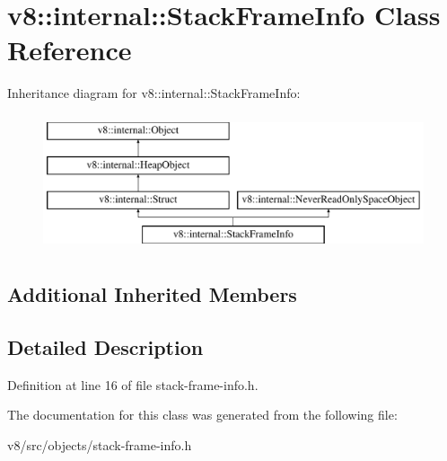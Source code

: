 \hypertarget{classv8_1_1internal_1_1StackFrameInfo}{}\section{v8\+:\+:internal\+:\+:Stack\+Frame\+Info Class Reference}
\label{classv8_1_1internal_1_1StackFrameInfo}
Inheritance diagram for v8\+:\+:internal\+:\+:Stack\+Frame\+Info\+:\begin{figure}[H]
\begin{center}
\leavevmode
\includegraphics[height=4.000000cm]{classv8_1_1internal_1_1StackFrameInfo}
\end{center}
\end{figure}
\subsection*{Additional Inherited Members}


\subsection{Detailed Description}


Definition at line 16 of file stack-\/frame-\/info.\+h.



The documentation for this class was generated from the following file\+:\begin{DoxyCompactItemize}
\item 
v8/src/objects/stack-\/frame-\/info.\+h\end{DoxyCompactItemize}
